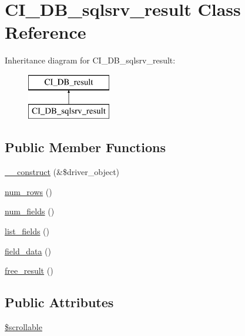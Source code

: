 \hypertarget{class_c_i___d_b__sqlsrv__result}{}\section{C\+I\+\_\+\+D\+B\+\_\+sqlsrv\+\_\+result Class Reference}
\label{class_c_i___d_b__sqlsrv__result}
Inheritance diagram for C\+I\+\_\+\+D\+B\+\_\+sqlsrv\+\_\+result\+:\begin{figure}[H]
\begin{center}
\leavevmode
\includegraphics[height=2.000000cm]{class_c_i___d_b__sqlsrv__result}
\end{center}
\end{figure}
\subsection*{Public Member Functions}
\begin{DoxyCompactItemize}
\item 
\mbox{\hyperlink{class_c_i___d_b__sqlsrv__result_a8e093c8b6e5733bc3f306385ee426ab7}{\+\_\+\+\_\+construct}} (\&\$driver\+\_\+object)
\item 
\mbox{\hyperlink{class_c_i___d_b__sqlsrv__result_a218657c303ee499b97710ab0cd2f5d6e}{num\+\_\+rows}} ()
\item 
\mbox{\hyperlink{class_c_i___d_b__sqlsrv__result_af831bf363e4d7d661a717a4932af449d}{num\+\_\+fields}} ()
\item 
\mbox{\hyperlink{class_c_i___d_b__sqlsrv__result_a50b54eb4ea7cfd039740f532988ea776}{list\+\_\+fields}} ()
\item 
\mbox{\hyperlink{class_c_i___d_b__sqlsrv__result_a84bffd65e53902ade1591716749a33e3}{field\+\_\+data}} ()
\item 
\mbox{\hyperlink{class_c_i___d_b__sqlsrv__result_aad2d98d6beb3d6095405356c6107b473}{free\+\_\+result}} ()
\end{DoxyCompactItemize}
\subsection*{Public Attributes}
\begin{DoxyCompactItemize}
\item 
\mbox{\hyperlink{class_c_i___d_b__sqlsrv__result_a76095eacf021915db9aabc44ecf58555}{\$scrollable}}
\end{DoxyCompactItemize}
